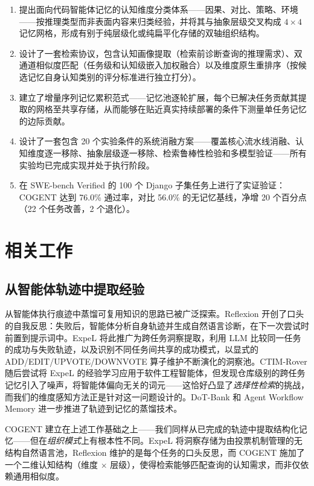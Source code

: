 \documentclass[UTF8,twocolumn]{ctexart}
\begin{document}
\begin{enumerate}[label=(C\arabic*), leftmargin=*]
    \item 提出面向代码智能体记忆的认知维度分类体系——因果、对比、策略、环境——按推理类型而非表面内容来归类经验，并将其与抽象层级交叉构成 $4 \times 4$ 记忆网格，形成有别于纯层级化或纯扁平化存储的双轴组织结构。
    \item 设计了一套检索协议，包含认知画像提取（检索前诊断查询的推理需求）、双通道相似度匹配（任务级和认知级嵌入加权融合）以及维度原生重排序（按候选记忆自身认知类别的评分标准进行独立打分）。
    \item 建立了增量序列记忆累积范式——记忆池逐轮扩展，每个已解决任务贡献其提取的网格至共享存储，从而能够在贴近真实持续部署的条件下测量单任务记忆的边际贡献。
    \item 设计了一套包含 20 个实验条件的系统消融方案——覆盖核心流水线消融、认知维度逐一移除、抽象层级逐一移除、检索鲁棒性检验和多模型验证——所有实验均已完成实现并处于执行阶段。
    \item 在 SWE-bench Verified 的 100 个 Django 子集任务上进行了实证验证：\textsc{COGENT} 达到 76.0\% 通过率，对比 56.0\% 的无记忆基线，净增 20 个百分点（22 个任务改善，2 个退化）。
\end{enumerate}

\section{相关工作}

\subsection{从智能体轨迹中提取经验}

从智能体执行痕迹中蒸馏可复用知识的思路已被广泛探索。Reflexion \cite{reflexion} 开创了口头的自我反思：失败后，智能体分析自身轨迹并生成自然语言诊断，在下一次尝试时前置到提示词中。ExpeL \cite{expel} 将此推广为跨任务洞察提取，利用 LLM 比较同一任务的成功与失败轨迹，以及识别不同任务间共享的成功模式，以显式的 ADD/EDIT/UPVOTE/DOWNVOTE 算子维护不断演化的洞察池。CTIM-Rover \cite{ctim-rover} 随后尝试将 ExpeL 的经验学习应用于软件工程智能体，但发现仓库级别的跨任务记忆引入了噪声，将智能体偏向无关的词元——这恰好凸显了\emph{选择性检索}的挑战，而我们的维度感知方法正是针对这一问题设计的。DoT-Bank \cite{dot-bank} 和 Agent Workflow Memory \cite{awm} 进一步推进了轨迹到记忆的蒸馏技术。

\textsc{COGENT} 建立在上述工作基础之上——我们同样从已完成的轨迹中提取结构化记忆——但在\emph{组织模式}上有根本性不同。ExpeL 将洞察存储为由投票机制管理的无结构自然语言池，Reflexion 维护的是每个任务的口头反思，而 \textsc{COGENT} 施加了一个二维认知结构（维度 $\times$ 层级），使得检索能够匹配查询的认知需求，而非仅依赖通用相似度。
\end{document}
